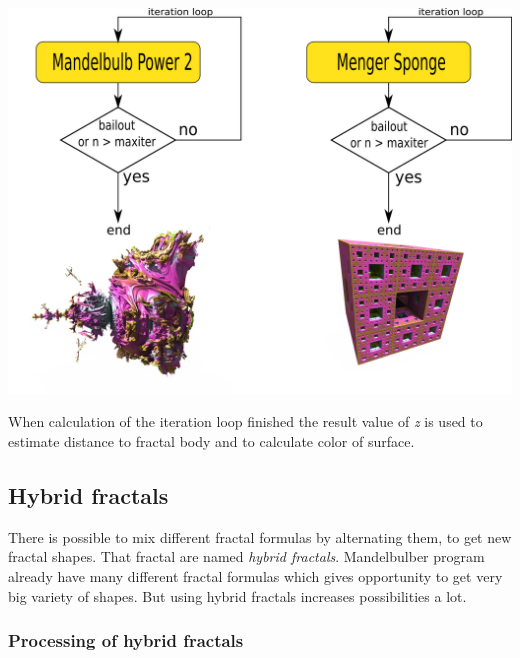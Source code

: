 \includegraphics[width=\linewidth]{img/manual/media/iteration_loops.png}
	
When calculation of the iteration loop finished the result value of \emph{z} is used to estimate distance to fractal body and to calculate color of surface.

\subsection{Hybrid fractals}

There is possible to mix different fractal formulas by alternating them, to get new fractal shapes. That fractal are named \emph{hybrid fractals}. Mandelbulber program already have many different fractal formulas which gives opportunity to get very big variety of shapes. But using hybrid fractals increases possibilities a lot. 

\subsubsection{Processing of hybrid fractals}


